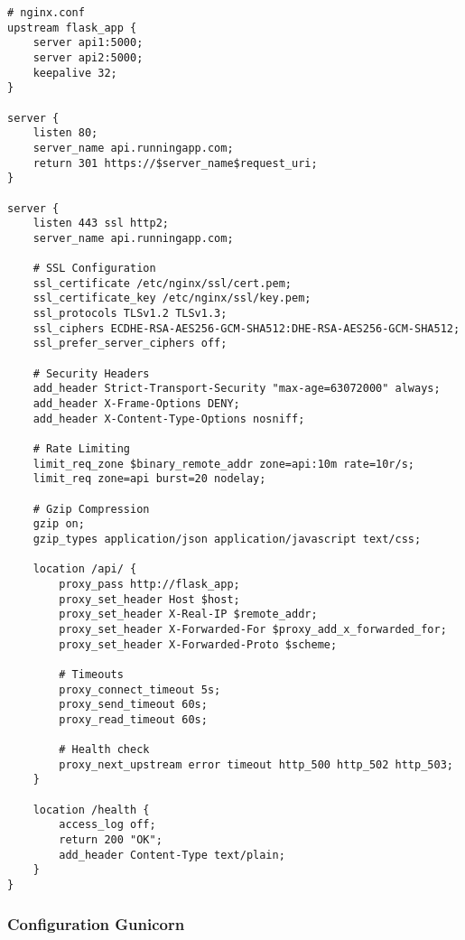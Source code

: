 \begin{lstlisting}[language=nginx]
# nginx.conf
upstream flask_app {
    server api1:5000;
    server api2:5000;
    keepalive 32;
}

server {
    listen 80;
    server_name api.runningapp.com;
    return 301 https://$server_name$request_uri;
}

server {
    listen 443 ssl http2;
    server_name api.runningapp.com;
    
    # SSL Configuration
    ssl_certificate /etc/nginx/ssl/cert.pem;
    ssl_certificate_key /etc/nginx/ssl/key.pem;
    ssl_protocols TLSv1.2 TLSv1.3;
    ssl_ciphers ECDHE-RSA-AES256-GCM-SHA512:DHE-RSA-AES256-GCM-SHA512;
    ssl_prefer_server_ciphers off;
    
    # Security Headers
    add_header Strict-Transport-Security "max-age=63072000" always;
    add_header X-Frame-Options DENY;
    add_header X-Content-Type-Options nosniff;
    
    # Rate Limiting
    limit_req_zone $binary_remote_addr zone=api:10m rate=10r/s;
    limit_req zone=api burst=20 nodelay;
    
    # Gzip Compression
    gzip on;
    gzip_types application/json application/javascript text/css;
    
    location /api/ {
        proxy_pass http://flask_app;
        proxy_set_header Host $host;
        proxy_set_header X-Real-IP $remote_addr;
        proxy_set_header X-Forwarded-For $proxy_add_x_forwarded_for;
        proxy_set_header X-Forwarded-Proto $scheme;
        
        # Timeouts
        proxy_connect_timeout 5s;
        proxy_send_timeout 60s;
        proxy_read_timeout 60s;
        
        # Health check
        proxy_next_upstream error timeout http_500 http_502 http_503;
    }
    
    location /health {
        access_log off;
        return 200 "OK";
        add_header Content-Type text/plain;
    }
}
\end{lstlisting}

\subsubsection{Configuration Gunicorn}

